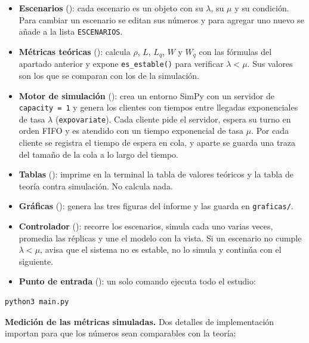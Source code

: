 \documentclass[11pt,a4paper]{article}
\begin{document}
\begin{itemize}
    \item \textbf{Escenarios} (): cada escenario es un
    objeto con su $\lambda$, su $\mu$ y su condición. Para cambiar un escenario se
    editan sus números y para agregar uno nuevo se añade a la lista \texttt{ESCENARIOS}.
    \item \textbf{Métricas teóricas} (): calcula $\rho$, $L$,
    $L_q$, $W$ y $W_q$ con las fórmulas del apartado anterior y expone
    \texttt{es\_estable()} para verificar $\lambda < \mu$. Sus valores son los que se
    comparan con los de la simulación.
    \item \textbf{Motor de simulación} (): crea un entorno
    SimPy con un servidor de \texttt{capacity = 1} y genera los clientes con tiempos
    entre llegadas exponenciales de tasa $\lambda$ (\texttt{expovariate}). Cada cliente
    pide el servidor, espera su turno en orden FIFO y es atendido con un tiempo
    exponencial de tasa $\mu$. Por cada cliente se registra el tiempo de espera en cola,
    y aparte se guarda una traza del tamaño de la cola a lo largo del tiempo.
    \item \textbf{Tablas} (): imprime en la terminal la tabla de
    valores teóricos y la tabla de teoría contra simulación. No calcula nada.
    \item \textbf{Gráficas} (): genera las tres figuras del
    informe y las guarda en \texttt{graficas/}.
    \item \textbf{Controlador} (): recorre los
    escenarios, simula cada uno varias veces, promedia las réplicas y une el modelo con
    la vista. Si un escenario no cumple $\lambda < \mu$, avisa que el sistema no es
    estable, no lo simula y continúa con el siguiente.
    \item \textbf{Punto de entrada} (): un solo comando ejecuta todo el
    estudio:
\end{itemize}

\begin{verbatim}
python3 main.py
\end{verbatim}

\noindent\textbf{Medición de las métricas simuladas.} Dos detalles de implementación
importan para que los números sean comparables con la teoría:
\end{document}
